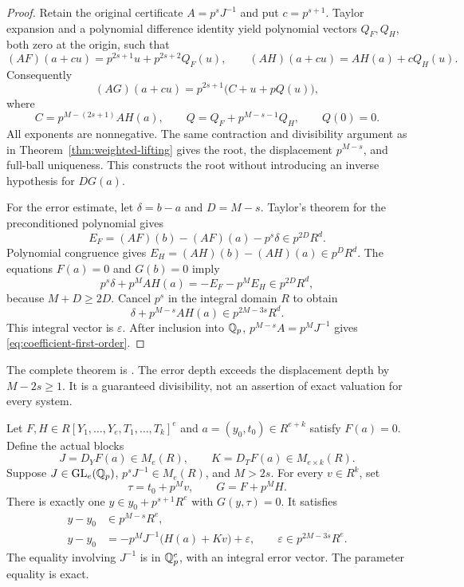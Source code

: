 \begin{proof}
Retain the original certificate $A=p^sJ^{-1}$ and put $c=p^{s+1}$.
Taylor expansion and a polynomial difference identity yield polynomial
vectors $Q_F,Q_H$, both zero at the origin, such that
\[
 (AF)(a+cu)=p^{2s+1}u+p^{2s+2}Q_F(u),\qquad
 (AH)(a+cu)=AH(a)+cQ_H(u).
\]
Consequently
\[
 (AG)(a+cu)=p^{2s+1}\bigl(C+u+pQ(u)\bigr),
\]
where
\[
 C=p^{M-(2s+1)}AH(a),\qquad
 Q=Q_F+p^{M-s-1}Q_H,\qquad Q(0)=0.
\]
All exponents are nonnegative. The same contraction and divisibility
argument as in Theorem~\ref{thm:weighted-lifting} gives the root,
the displacement $p^{M-s}$, and full-ball uniqueness. This constructs the
root without introducing an inverse hypothesis for $DG(a)$.

For the error estimate, let $\delta=b-a$ and $D=M-s$. Taylor's theorem
for the preconditioned polynomial gives
\[
 E_F=(AF)(b)-(AF)(a)-p^s\delta\in p^{2D}R^d.
\]
Polynomial congruence gives
$E_H=(AH)(b)-(AH)(a)\in p^DR^d$.
The equations $F(a)=0$ and $G(b)=0$ imply
\[
 p^s\delta+p^MAH(a)=-E_F-p^ME_H\in p^{2D}R^d,
\]
because $M+D\ge2D$. Cancel $p^s$ in the integral domain $R$ to obtain
\[
 \delta+p^{M-s}AH(a)\in p^{2M-3s}R^d.
\]
This integral vector is $\varepsilon$. After inclusion into $\mathbb Q_p$,
$p^{M-s}A=p^MJ^{-1}$ gives \eqref{eq:coefficient-first-order}.
\end{proof}

The complete theorem is
.
The error depth exceeds the displacement depth by $M-2s\ge1$. It is a
guaranteed divisibility, not an assertion of exact valuation for every
system.

\begin{theorem}
\label{thm:joint-deformation}
Let $F,H\in R[Y_1,\ldots,Y_e,T_1,\ldots,T_k]^e$ and
$a=(y_0,t_0)\in R^{e+k}$ satisfy $F(a)=0$. Define the actual blocks
\[
 J=D_YF(a)\in M_e(R),\qquad K=D_TF(a)\in M_{e\times k}(R).
\]
Suppose $J\in\operatorname{GL}_e(\mathbb Q_p)$,
$p^sJ^{-1}\in M_e(R)$, and $M>2s$. For every $v\in R^k$, set
\[
 \tau=t_0+p^Mv,\qquad G=F+p^MH.
\]
There is exactly one $y\in y_0+p^{s+1}R^e$ with $G(y,\tau)=0$.
It satisfies
\begin{equation}\label{eq:joint-first-order}
 \begin{aligned}
  y-y_0&\in p^{M-s}R^e,\\
  y-y_0&=-p^MJ^{-1}\bigl(H(a)+Kv\bigr)+\varepsilon,
  \qquad\varepsilon\in p^{2M-3s}R^e.
 \end{aligned}
\end{equation}
The equality involving $J^{-1}$ is in $\mathbb Q_p^e$, with an integral error
vector. The parameter equality is exact.
\end{theorem}

